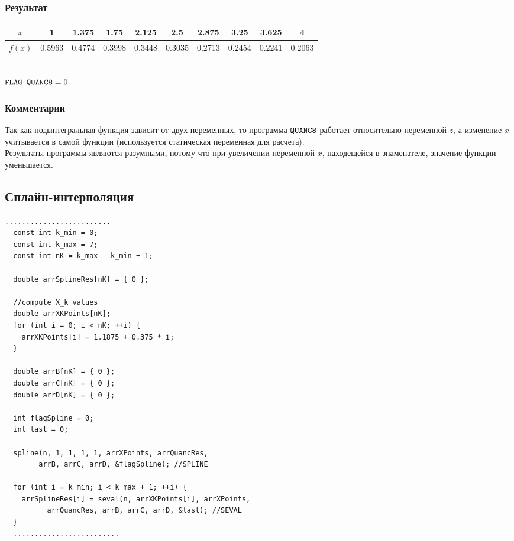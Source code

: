 \documentclass[a4paper,11pt]{article}
\begin{document}
\subsubsection{Результат}
\begin{tabular}{ | c | c | c | c | c | c | c | c | c | c | }
  \hline
  \footnotesize
  $x$ & 1 & 1.375 & 1.75 & 2.125 & 2.5 & 2.875 & 3.25 & 3.625 & 4 \\ \hline
  $f(x)$ & 0.5963 & 0.4774 & 0.3998 & 0.3448 & 0.3035 & 0.2713 & 0.2454 & 0.2241 & 0.2063 \\ \hline
\end{tabular} \\

$\verb|FLAG QUANC8| = 0$

\subsubsection{Комментарии}
\noindent Так как подынтегральная функция зависит от двух переменных,
      то программа $\verb|QUANC8|$ работает относительно переменной $z$,
      а изменение $x$ учитывается в самой функции
      (используется статическая переменная для расчета). \\

\noindent Результаты программы являются разумными, потому что при увеличении переменной $x$,
      находещейся в знаменателе, значение функции уменьшается.

\vspace{5mm}
\subsection{Сплайн-интерполяция}
\begin{lstlisting}[label=spline,caption=SPLINE-SEVAL]
  .........................
  const int k_min = 0;
  const int k_max = 7;
  const int nK = k_max - k_min + 1;

  double arrSplineRes[nK] = { 0 };

  //compute X_k values
  double arrXKPoints[nK];
  for (int i = 0; i < nK; ++i) {
    arrXKPoints[i] = 1.1875 + 0.375 * i;
  }

  double arrB[nK] = { 0 };
  double arrC[nK] = { 0 };
  double arrD[nK] = { 0 };

  int flagSpline = 0;
  int last = 0;

  spline(n, 1, 1, 1, 1, arrXPoints, arrQuancRes,
        arrB, arrC, arrD, &flagSpline); //SPLINE

  for (int i = k_min; i < k_max + 1; ++i) {
    arrSplineRes[i] = seval(n, arrXKPoints[i], arrXPoints,
          arrQuancRes, arrB, arrC, arrD, &last); //SEVAL
  }
  .........................
\end{lstlisting}
\end{document}
